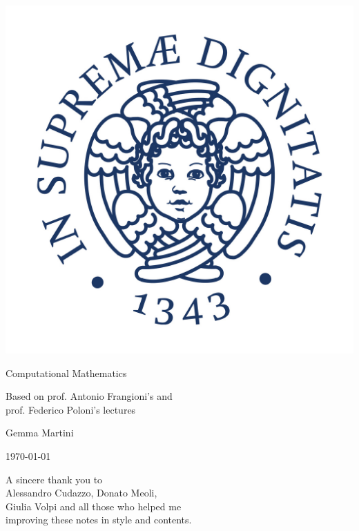 \documentclass[preview,12pt]{article}
\begin{document}
\begin{titlepage}
\begin{center}
\vspace{3cm}

\Large

\vspace{2cm}

\includegraphics[scale=0.3]{pics/Cherubino.jpg}

\vspace{2.5cm}

{\Huge \sc Computational Mathematics}

\vspace{2cm}
Based on prof. Antonio Frangioni's and\\
  prof. Federico Poloni's lectures

\vspace{2cm}
Gemma Martini
\vfill

\today

\end{center}
\end{titlepage}

\shipout\null
\newpage



\phantom{pippo}
\vspace{5cm}
\begin{flushleft}
A sincere thank you to\\
Alessandro Cudazzo, Donato Meoli,\\
Giulia Volpi and all those who helped me\\
improving these notes in style and contents.\\
\end{flushleft}
\newpage


\newpage

\newpage

\end{document}
